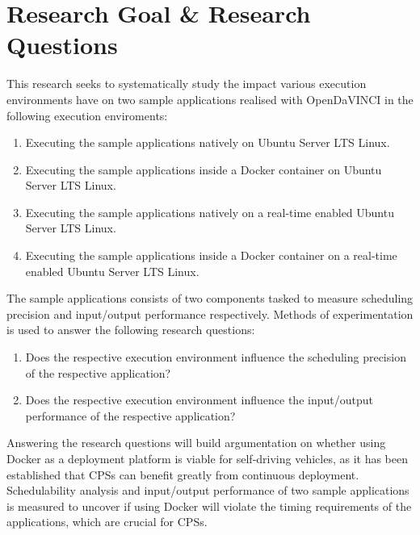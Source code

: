\section{Research Goal \& Research Questions}

This research seeks to systematically study the impact various execution environments have on two sample applications realised with OpenDaVINCI in the following execution enviroments:\\ 

\begin{enumerate}
\item Executing the sample applications natively on Ubuntu Server LTS Linux.
\item Executing the sample applications inside a Docker container on Ubuntu Server LTS Linux.
\item Executing the sample applications natively on a real-time enabled Ubuntu Server LTS Linux.
\item Executing the sample applications inside a Docker container on a real-time enabled Ubuntu Server LTS Linux.\\
\end{enumerate}

The sample applications consists of two components tasked to measure scheduling precision and input/output performance respectively. 
Methods of experimentation is used to answer the following research questions:\\
\begin{enumerate}[label=\textbf{RQ\arabic*}]
\label{section:rqs}
	\item Does the respective execution environment influence the scheduling precision of the respective application?
	\item Does the respective execution environment influence the input/output performance of the respective application?\\
\end{enumerate}

Answering the research questions will build argumentation on whether using Docker as a deployment platform is viable for self-driving vehicles, as it has been established that CPSs can benefit greatly from continuous deployment. Schedulability analysis and input/output performance of two sample applications is measured to uncover if using Docker will violate the timing requirements of the applications, which are crucial for CPSs.



